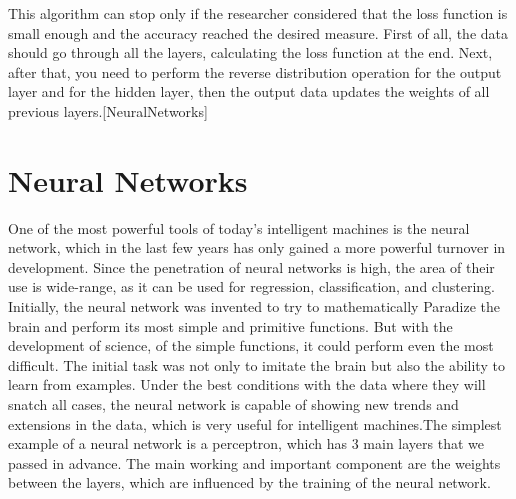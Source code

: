 \vspace{-0.5cm}
\noindent This algorithm can stop only if the researcher considered that the loss function is small enough and the accuracy reached the desired measure. First of all, the data should go through all the layers, calculating the loss function at the end. Next, after that, you need to perform the reverse distribution operation for the output layer and for the hidden layer, then the output data updates the weights of all previous layers.[NeuralNetworks]

\vspace{-0.3cm}




\section{Neural Networks}\label{sec:3.8}
\vspace{-0.5cm}
\noindent One of the most powerful tools of today's intelligent machines is the neural network, which in the last few years has only gained a more powerful turnover in development. Since the penetration of neural networks is high, the area of their use is wide-range, as it can be used for regression, classification, and clustering. Initially, the neural network was invented to try to mathematically Paradize the brain and perform its most simple and primitive functions. But with the development of science, of the simple functions, it could perform even the most difficult. The initial task was not only to imitate the brain but also the ability to learn from examples. Under the best conditions with the data where they will snatch all cases, the neural network is capable of showing new trends and extensions in the data, which is very useful for intelligent machines.The simplest example of a neural network is a perceptron, which has 3 main layers that we passed in advance. The main working and important component are the weights between the layers, which are influenced by the training of the neural network.
